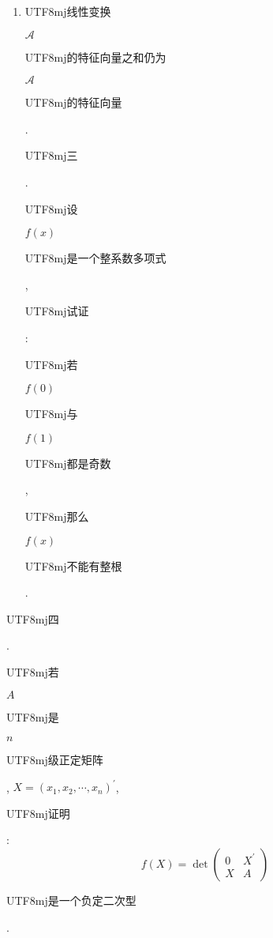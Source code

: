 \documentclass[10pt]{article}
\begin{document}
\begin{enumerate}
  \item \begin{CJK}{UTF8}{mj}线性变换\end{CJK} $\mathscr{A}$ \begin{CJK}{UTF8}{mj}的特征向量之和仍为\end{CJK} $\mathscr{A}$ \begin{CJK}{UTF8}{mj}的特征向量\end{CJK}. \begin{CJK}{UTF8}{mj}三\end{CJK}. \begin{CJK}{UTF8}{mj}设\end{CJK} $f(x)$ \begin{CJK}{UTF8}{mj}是一个整系数多项式\end{CJK}, \begin{CJK}{UTF8}{mj}试证\end{CJK}: \begin{CJK}{UTF8}{mj}若\end{CJK} $f(0)$ \begin{CJK}{UTF8}{mj}与\end{CJK} $f(1)$ \begin{CJK}{UTF8}{mj}都是奇数\end{CJK}, \begin{CJK}{UTF8}{mj}那么\end{CJK} $f(x)$ \begin{CJK}{UTF8}{mj}不能有整根\end{CJK}.

\end{enumerate}
\begin{CJK}{UTF8}{mj}四\end{CJK}. \begin{CJK}{UTF8}{mj}若\end{CJK} $A$ \begin{CJK}{UTF8}{mj}是\end{CJK} $n$ \begin{CJK}{UTF8}{mj}级正定矩阵\end{CJK}, $X=\left(x_{1}, x_{2}, \cdots, x_{n}\right)^{\prime}$, \begin{CJK}{UTF8}{mj}证明\end{CJK}:
$$
f(X)=\operatorname{det}\left(\begin{array}{cc}
0 & X^{\prime} \\
X & A
\end{array}\right)
$$
\begin{CJK}{UTF8}{mj}是一个负定二次型\end{CJK}.
\end{document}
